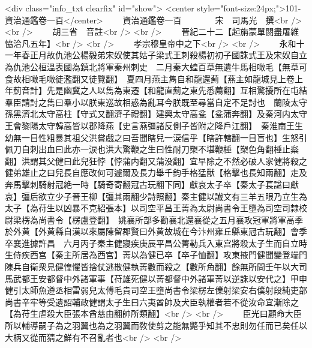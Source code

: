 <div class="info_txt clearfix" id="show">
<center style="font-size:24px;">101-資治通鑑卷一百</center>
  　　資治通鑑卷一百　　　　宋　司馬光　撰<br />
<br />
　　胡三省　音註<br />
<br />
　　晉紀二十二【起旃蒙單閼盡屠維恊洽凡五年】<br />
<br />
　　孝宗穆皇帝中之下<br />
<br />
　　永和十一年春正月故仇池公楊毅弟宋奴使其姑子梁式王刺殺楊初初子國誅式王及宋奴自立為仇池公桓溫表國為鎮北將軍秦州刺史　二月秦大蝗百草無遺牛馬相噉毛【無草可食故相噉毛噉徒濫翻又徒覽翻】　夏四月燕主雋自和龍還薊【燕主如龍城見上卷上年薊音計】先是幽冀之人以雋為東遷【和龍直薊之東先悉薦翻】互相驚擾所在屯結羣臣請討之雋曰羣小以朕東巡故相惑為亂耳今朕既至尋當自定不足討也　蘭陵太守孫黑濟北太守高柱【守式又翻濟子禮翻】建興太守高瓫【瓫蒲奔翻】及秦河内太守王會黎陽太守韓高皆以郡降燕【史言燕彊諸反側子皆附之降戶江翻】　秦淮南王生幼無一目性粗暴其祖父洪嘗戲之曰吾聞瞎兒一涙信乎【瞎許轄翻一目盲也】生怒引佩刀自刺出血曰此亦一涙也洪大驚鞭之生曰性耐刀槊不堪鞭棰【槊色角翻棰止橤翻】洪謂其父健曰此兒狂悖【悖蒲内翻又蒲没翻】宜早除之不然必破人家健將殺之健弟雄止之曰兒長自應改何可遽爾及長力舉千鈞手格猛獸【格擊也長知兩翻】走及奔馬擊刺騎射冠絶一時【騎奇寄翻冠古玩翻下同】獻哀太子卒【秦太子萇諡曰獻哀】彊后欲立少子晉王柳【彊其兩翻少詩照翻】秦主健以䜟文有三羊五眼乃立生為太子【為苻生以凶暴不克紹張本】以司空平昌王菁為太尉尚書令王墮為司空司隸校尉梁楞為尚書令【楞盧登翻】　姚襄所部多勸襄北還襄從之五月襄攻冠軍將軍高季於外黄【外黄縣自漢以來屬陳留郡賢曰外黄故城在今汴州雍丘縣東冠古玩翻】會季卒襄進據許昌　六月丙子秦主健寢疾庚辰平昌公菁勒兵入東宫將殺太子生而自立時生侍疾西宫【秦主所居為西宫】菁以為健已卒【卒子恤翻】攻東掖門健聞變登端門陳兵自衛衆見健惶懼皆捨仗逃散健執菁數而殺之【數所角翻】餘無所問壬午以大司馬武都王安都督中外諸軍事【苻雄死健以菁都督中外諸軍菁以逆誅以安代之】甲申健引太師魚遵丞相雷弱兒太傅毛貴司空王墮尚書令梁楞左㒒射梁安右僕射段純吏部尚書辛牢等受遺詔輔政健謂太子生曰六夷酋帥及犬臣執權者若不從汝命宜漸除之【為苻生虐殺大臣張本酋慈由翻帥所類翻】<br />
<br />
　　臣光曰顧命大臣所以輔導嗣子為之羽翼也為之羽翼而敎使剪之能無斃乎知其不忠則勿任而已矣任以大柄又從而猜之鮮有不召亂者也<br />
<br />

